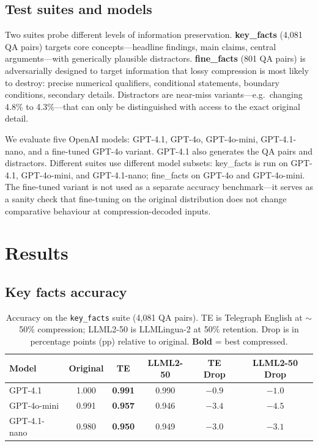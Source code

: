 \documentclass{article}
\begin{document}
\subsection{Test suites and models}

Two suites probe different levels of information preservation. \textbf{key\_facts} (4{,}081 QA pairs) targets core concepts---headline findings, main claims, central arguments---with generically plausible distractors. \textbf{fine\_facts} (801 QA pairs) is adversarially designed to target information that lossy compression is most likely to destroy: precise numerical qualifiers, conditional statements, boundary conditions, secondary details. Distractors are near-miss variants---e.g.\ changing 4.8\% to 4.3\%---that can only be distinguished with access to the exact original detail.

We evaluate five OpenAI models: GPT-4.1, GPT-4o, GPT-4o-mini, GPT-4.1-nano, and a fine-tuned GPT-4o variant. GPT-4.1 also generates the QA pairs and distractors. Different suites use different model subsets: key\_facts is run on GPT-4.1, GPT-4o-mini, and GPT-4.1-nano; fine\_facts on GPT-4o and GPT-4o-mini. The fine-tuned variant is not used as a separate accuracy benchmark---it serves as a sanity check that fine-tuning on the original distribution does not change comparative behaviour at compression-decoded inputs.

\section{Results}
\label{sec:results}

\subsection{Key facts accuracy}

\begin{table}[h]
  \caption{Accuracy on the \texttt{key\_facts} suite (4{,}081 QA pairs). TE is Telegraph English at $\sim$50\% compression; LLML2-50 is LLMLingua-2 at 50\% retention. Drop is in percentage points (pp) relative to original. \textbf{Bold} = best compressed.}
  \label{tab:key-facts}
  \centering
  \small
  \begin{tabular}{lccccc}
    \toprule
    Model & Original & TE & LLML2-50 & TE Drop & LLML2-50 Drop \\
    \midrule
    GPT-4.1       & 1.000 & \textbf{0.991} & 0.990 & $-0.9$ & $-1.0$ \\
    GPT-4o-mini   & 0.991 & \textbf{0.957} & 0.946 & $-3.4$ & $-4.5$ \\
    GPT-4.1-nano  & 0.980 & \textbf{0.950} & 0.949 & $-3.0$ & $-3.1$ \\
    \bottomrule
  \end{tabular}
\end{table}
\end{document}
